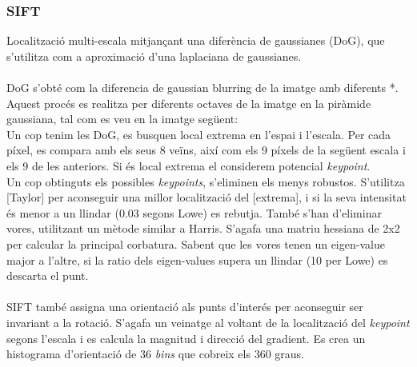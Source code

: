 	\subsubsection{SIFT}
	Localització multi-escala mitjançant una diferència de gaussianes (DoG), que s'utilitza com a aproximació d'una laplaciana de gaussianes.\\\\
	[TO-DO]DoG s'obté com la diferencia de gaussian blurring de la imatge amb diferents *. Aquest procés es realitza per diferents octaves de la imatge en la
	piràmide gaussiana, tal com es veu en la imatge següent:\\
	[IMAGE SCALE OCTAVE]
	Un cop tenim les DoG, es busquen {local extrema} en l'espai i l'escala. Per cada píxel, es compara amb els seus 8 veïns, així com els 9 píxels de la
	següent escala i els 9 de les anteriors. Si és {local extrema} el considerem potencial \textit{keypoint}.\\
	[IMAGE SPACE-SCALE]
	Un cop obtinguts els possibles \textit{keypoints}, s'eliminen els menys robustos. S'utilitza [Taylor] per aconseguir una millor localització del [extrema],
	i si la seva intensitat és menor a un llindar (0.03 segons Lowe) es rebutja. També s'han d'eliminar vores, utilitzant un mètode similar a Harris.
	S'agafa una matriu hessiana de 2x2 per calcular la principal corbatura. Sabent que les vores tenen un eigen-value major a l'altre, si la ratio dels
	{eigen-values} supera un llindar (10 per Lowe) es descarta el punt. \\\\
	SIFT també assigna una orientació als punts d'interés per aconseguir ser invariant a la rotació. S'agafa un veinatge al voltant de la localització del
	\textit{keypoint} segons l'escala i es calcula la magnitud i direcció del gradient. Es crea un histograma d'orientació de 36 \textit{bins}
	que cobreix els 360 graus.

